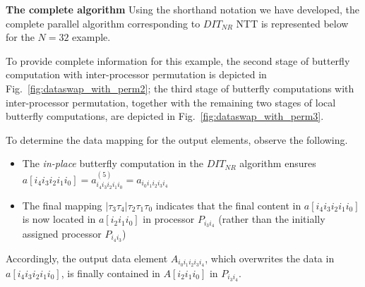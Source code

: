 \documentclass[submission]{iacrtrans}
\theoremstyle{plain}
\begin{document}
\textbf{The complete algorithm} Using the shorthand notation we have developed, the complete parallel algorithm corresponding to $DIT_{NR}$ NTT is represented below for the $N=32$ example.
\begin{table}[h!]\begin{center}
\end{center}\end{table}

To provide complete information for this example, the second stage of butterfly computation with inter-processor permutation is depicted in Fig.~\ref{fig:dataswap_with_perm2}; the third stage of butterfly computations with inter-processor permutation, together with the remaining two stages of local butterfly computations, are depicted in Fig.~\ref{fig:dataswap_with_perm3}.

To determine the data mapping for the output elements, observe the following.
\begin{itemize}
    \item The \textit{in-place} butterfly computation in the $DIT_{NR}$ algorithm ensures $a[i_4i_3i_2i_1i_0]=a_{i_4i_3i_2i_1i_0}^{(5)}=a_{i_0i_1i_2i_3i_4}$
    \item The final mapping $|\tau_3\tau_4|\tau_2\tau_1\tau_0$ indicates that the final content in $a[i_4i_3i_2i_1i_0]$ is now located in $a[i_2i_1i_0]$ in processor $P_{i_3i_4}$ (rather than the initially assigned processor $P_{i_4i_3}$)
\end{itemize}

Accordingly, the output data element $A_{i_0i_1i_2i_3i_4}$, which overwrites the data in $a[i_4i_3i_2i_1i_0]$, is finally contained in $A[i_2i_1i_0]$ in $P_{i_3i_4}$.
\end{document}
